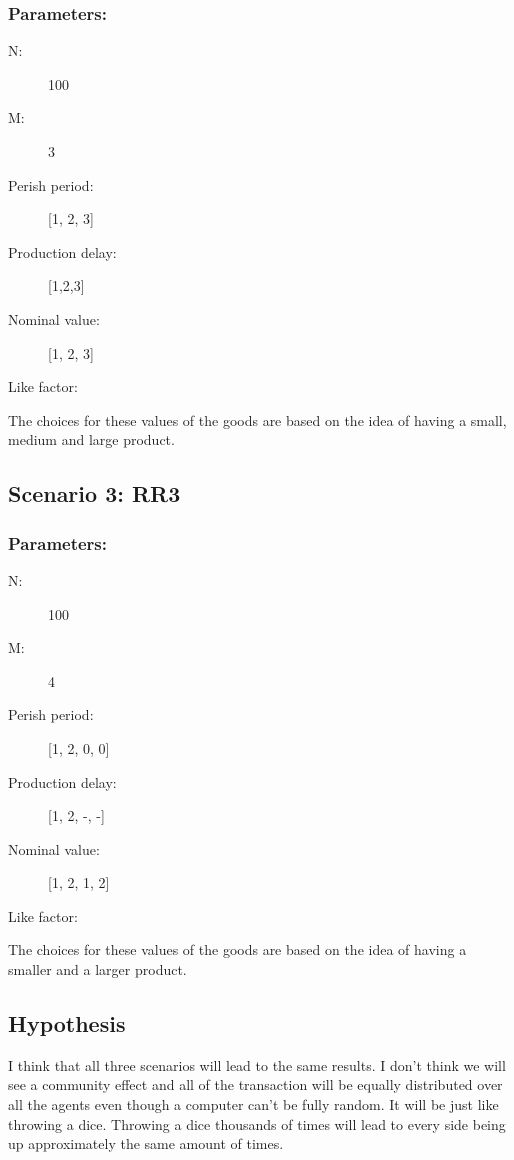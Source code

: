 \documentclass{article}
\begin{document}
\subsubsection{Parameters:}
\begin{description}
  \item[N:] 100
  \item[M:] 3
  \item[Perish period:] [1, 2, 3]
  \item[Production delay:] [1,2,3]
  \item[Nominal value:] [1, 2, 3]
  \item[Like factor:] 
\end{description}

The choices for these values of the goods are based on the idea of having a small, medium and large product.

\subsection{Scenario 3: RR3}
\subsubsection{Parameters:}
\begin{description}
  \item[N:] 100
  \item[M:] 4
  \item[Perish period:] [1, 2, 0, 0]
  \item[Production delay:] [1, 2, -, -]
  \item[Nominal value:] [1, 2, 1, 2]
  \item[Like factor:] 
\end{description}

The choices for these values of the goods are based on the idea of having a smaller and a larger product.

\subsection{Hypothesis}
I think that all three scenarios will lead to the same results. I don’t think we will see a community effect and all of the transaction will be equally distributed over all the agents even though a computer can’t be fully random. It will be just like throwing a dice. Throwing a dice thousands of times will lead to every side being up approximately the same amount of times. 

\end{document}
